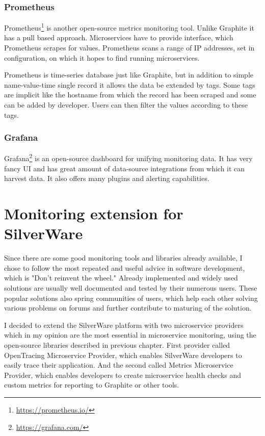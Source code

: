 \documentclass[12pt,oneside]{fithesis2}
\begin{document}
\subsection{Prometheus}

Prometheus\footnote{\url{https://prometheus.io/}} is another open-source metrics monitoring tool. Unlike Graphite it has a pull based approach. Microservices have to provide interface, which Prometheus scrapes for values. Prometheus scans a range of IP addresses, set in configuration, on which it hopes to find running microservices.

Prometheus is time-series database just like Graphite, but in addition to simple name-value-time single record it allows the data be extended by tags. Some tags are implicit like the hostname from which the record has been scraped and some can be added by developer. Users can then filter the values according to these tags.

\subsection{Grafana}

Grafana\footnote{\url{https://grafana.com/}} is an open-source dashboard for unifying monitoring data. It has very fancy UI and has great amount of data-source integrations from which it can harvest data. It also offers many plugins and alerting capabilities.

\chapter{Monitoring extension for SilverWare}

Since there are some good monitoring tools and libraries already available, I chose to follow the most repeated and useful advice in software development, which is "Don't reinvent the wheel." Already implemented and widely used solutions are usually well documented and tested by their numerous users. These popular solutions also spring communities of users, which help each other solving various problems on forums and further contribute to maturing of the solution.

I decided to extend the SilverWare platform with two microservice providers which in my opinion are the most essential in microservice monitoring, using the open-source libraries described in previous chapter. First provider called OpenTracing Microservice Provider, which enables SilverWare developers to easily trace their application. And the second called Metrics Microservice Provider, which enables developers to create microservice health checks and custom metrics for reporting to Graphite or other tools.
\end{document}
